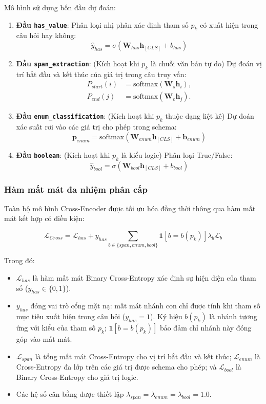 \documentclass[10pt,twocolumn,a4paper]{article}
\begin{document}
Mô hình sử dụng bốn đầu dự đoán:
\begin{enumerate}
    \item \textbf{Đầu \texttt{has\_value}}: Phân loại nhị phân xác định tham số $p_k$ có xuất hiện trong câu hỏi hay không:
   $$\hat{y}_{has} = \sigma(\mathbf{W}_{has} \mathbf{h}_{[CLS]} + b_{has})$$
    \item \textbf{Đầu \texttt{span\_extraction}}: (Kích hoạt khi $p_k$ là chuỗi văn bản tự do) Dự đoán vị trí bắt đầu và kết thúc của giá trị trong câu truy vấn:
   \begin{align*}
   P_{start}(i) &= \text{softmax}(\mathbf{W}_s \mathbf{h}_i), \\
   P_{end}(j) &= \text{softmax}(\mathbf{W}_e \mathbf{h}_j).
   \end{align*}
    \item \textbf{Đầu \texttt{enum\_classification}}: (Kích hoạt khi $p_k$ thuộc dạng liệt kê) Dự đoán xác suất rơi vào các giá trị cho phép trong schema:
   $$\mathbf{p}_{enum} = \text{softmax}(\mathbf{W}_{enum} \mathbf{h}_{[CLS]} + \mathbf{b}_{enum})$$
    \item \textbf{Đầu \texttt{boolean}}: (Kích hoạt khi $p_k$ là kiểu logic) Phân loại True/False:
   $$\hat{y}_{bool} = \sigma(\mathbf{W}_{bool} \mathbf{h}_{[CLS]} + b_{bool})$$
\end{enumerate}

\subsubsection{Hàm mất mát đa nhiệm phân cấp}
Toàn bộ mô hình Cross-Encoder được tối ưu hóa đồng thời thông qua hàm mất mát kết hợp có điều kiện:

$$\mathcal{L}_{Cross} = \mathcal{L}_{has} + y_{has} \sum_{b \in \{span,enum,bool\}} \mathbf{1}[b=b(p_k)]\lambda_b\mathcal{L}_b$$

Trong đó:
\begin{itemize}
    \item $\mathcal{L}_{has}$ là hàm mất mát Binary Cross-Entropy xác định sự hiện diện của tham số ($y_{has} \in \{0, 1\}$).
    \item $y_{has}$ đóng vai trò cổng mặt nạ: mất mát nhánh con chỉ được tính khi tham số mục tiêu xuất hiện trong câu hỏi ($y_{has}=1$). Ký hiệu $b(p_k)$ là nhánh tương ứng với kiểu của tham số $p_k$; $\mathbf{1}[b=b(p_k)]$ bảo đảm chỉ nhánh này đóng góp vào mất mát.
    \item $\mathcal{L}_{span}$ là tổng mất mát Cross-Entropy cho vị trí bắt đầu và kết thúc; $\mathcal{L}_{enum}$ là Cross-Entropy đa lớp trên các giá trị được schema cho phép; và $\mathcal{L}_{bool}$ là Binary Cross-Entropy cho giá trị logic.
    \item Các hệ số cân bằng được thiết lập $\lambda_{span}=\lambda_{enum}=\lambda_{bool}=1.0$.
\end{itemize}
\end{document}
